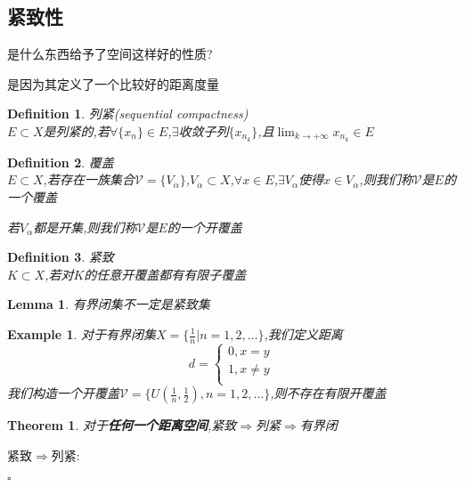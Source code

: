 \documentclass[11pt,hyperref,a4paper,UTF8]{ctexart}
\newtheorem{theorem}{Theorem}[subsection]
\newtheorem{lemma}{Lemma}[subsection]
\newtheorem{example}{Example}[subsection]
\newtheorem{definition}{Definition}[subsection]
\newenvironment{cproof}{%
\heiti{证明}\kaishu
}{%
  \hfill $\square$
  \par\bigskip
}
\begin{document}
\begin{CJK}{UTF8}{gkai}
\subsection{紧致性}
是什么东西给予了空间这样好的性质?

是因为其定义了一个比较好的距离度量

\begin{definition}
  列紧(sequential compactness)\\

  $E \subset X$是列紧的,若$\forall \{x_n\} \in E$,$\exists$收敛子列$\{x_{n_k}\}$,且$\lim_{k \to +\infty}x_{n_k} \in E$
\end{definition}

\begin{definition}
  覆盖\\

  $E \subset X$,若存在一族集合$\mathcal{V} = \{V_\alpha\}$,$V_\alpha \subset X$,$\forall x \in E$,$\exists V_\alpha$使得$x\in V_\alpha$,则我们称$\mathcal{V}$是$E$的一个覆盖

  若$V_\alpha$都是开集,则我们称$\mathcal{V}$是$E$的一个开覆盖
\end{definition}

\begin{definition}
  紧致\\

  $K \subset X$,若对$K$的任意开覆盖都有有限子覆盖
\end{definition}

\begin{lemma}
  有界闭集不一定是紧致集\\
\end{lemma}

\begin{example}
  对于有界闭集$X = \{\frac{1}{n}| n = 1,2,\ldots\}$,我们定义距离
  \[d = \begin{cases}
    0,x = y\\
    1,x\neq y\\
  \end{cases}\]
  我们构造一个开覆盖$\mathcal{V} = \{U(\frac{1}{n},\frac{1}{2}),n = 1,2,\ldots\}$,则不存在有限开覆盖
\end{example}

\begin{theorem}
  对于\textbf{任何一个距离空间},紧致$\Rightarrow$列紧$\Rightarrow$有界闭
\end{theorem}

\begin{cproof}
  紧致$\Rightarrow$列紧:


\end{cproof}
\end{CJK}
\end{document}
